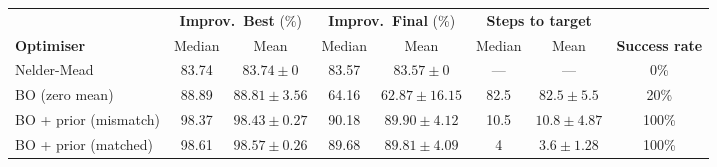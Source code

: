 \begin{table}
\begin{tabular}{l cc cc cc c}
\toprule
 & \multicolumn{2}{c}{\textbf{Improv.\ Best} (\%)}
 & \multicolumn{2}{c}{\textbf{Improv.\ Final} (\%)}
 & \multicolumn{2}{c}{\textbf{Steps to target}}
 & \\
\cmidrule(lr){2-3} \cmidrule(lr){4-5} \cmidrule(lr){6-7}
\textbf{Optimiser} & Median & Mean & Median & Mean & Median & Mean & \textbf{Success rate} \\
\midrule
Nelder-Mead           & 83.74 & $83.74 \pm 0$    & 83.57 & $83.57 \pm 0$      & ---  & ---              & 0\%   \\
BO (zero mean)        & 88.89 & $88.81 \pm 3.56$ & 64.16 & $62.87 \pm 16.15$  & 82.5 & $82.5 \pm 5.5$   & 20\%  \\
BO + prior (mismatch) & 98.37 & $98.43 \pm 0.27$ & 90.18 & $89.90 \pm 4.12$   & 10.5 & $10.8 \pm 4.87$  & 100\% \\
BO + prior (matched)  & 98.61 & $98.57 \pm 0.26$ & 89.68 & $89.81 \pm 4.09$   & 4    & $3.6 \pm 1.28$   & 100\% \\
\bottomrule
\end{tabular}

\end{table}
\clearpage




